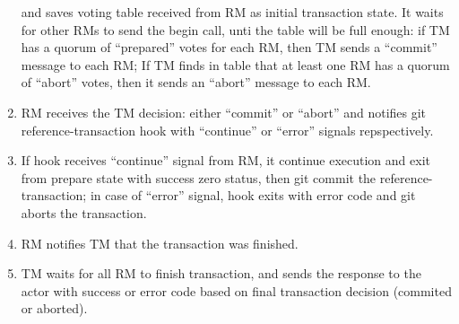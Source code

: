 \documentclass[acmlarge, screen, nonacm, 11pt]{acmart}
\begin{document}
\begin{enumerate}
      and saves voting table received from RM as initial transaction state. It waits for other RMs to send the
      begin call, unti the table will be full enough: if TM has a quorum of ``prepared'' votes for each RM,
      then TM sends a ``commit'' message to each RM; If TM finds in table that at least one RM has a quorum
      of ``abort'' votes, then it sends an ``abort'' message to each RM.
    \item RM receives the TM decision: either ``commit'' or ``abort'' and notifies git reference-transaction
      hook with ``continue'' or ``error'' signals repspectively.
    \item If hook receives ``continue'' signal from RM, it continue execution and exit from prepare state
      with success zero status, then git commit the reference-transaction;
      in case of ``error'' signal, hook exits with error code and git aborts the transaction.
    \item RM notifies TM that the transaction was finished.
    \item TM waits for all RM to finish transaction, and sends the response to the actor with success or error
      code based on final transaction decision (commited or aborted).
\end{enumerate}
\end{document}
